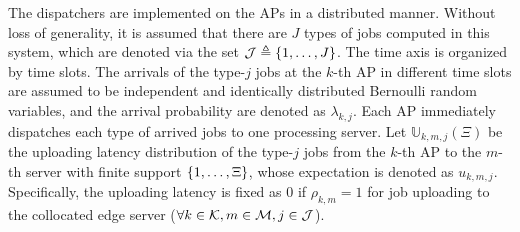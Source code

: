 The dispatchers are implemented on the APs in a distributed manner.
Without loss of generality, it is assumed that there are $J$ types of jobs computed in this system, which are denoted via the set $\mathcal{J} \triangleq \{1,\dots,J\}$.
The time axis is organized by time slots.
The arrivals of the type-$j$ jobs at the $k$-th AP in different time slots are assumed to be independent and identically distributed Bernoulli random variables, and the arrival probability are denoted as $\lambda_{k,j}$.
Each AP immediately dispatches each type of arrived jobs to one processing server.
Let $\mathbb{U}_{k,m,j}(\Xi)$ be the uploading latency distribution of the type-$j$ jobs from the $k$-th AP to the $m$-th server with finite support $\{1, \dots, \Xi\}$, whose expectation is denoted as $u_{k,m,j}$.
Specifically, the uploading latency is fixed as $0$ if $\rho_{k,m}=1$ for job uploading to the collocated edge server ($\forall k\in\mathcal{K},m\in\mathcal{M},j\in\mathcal{J}$).

